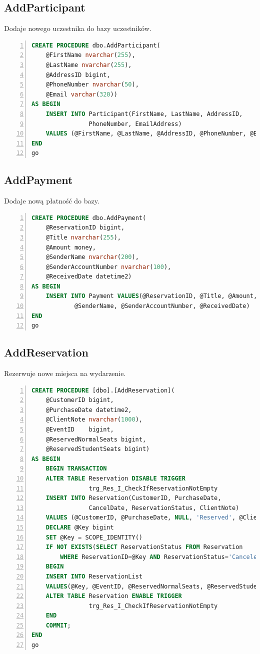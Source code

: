 \documentclass[]{article}
\begin{document}
	\subsection{AddParticipant}
	Dodaje nowego uczestnika do bazy uczestników.
	\begin{lstlisting}[language=SQL,
						showspaces=false,
						basicstyle=\ttfamily,
						numbers=left,
						numberstyle=\tiny,
						backgroundcolor=\color{lightg},
						keywordstyle=\color{lightblue},
						commentstyle=\color{gray}]
CREATE PROCEDURE dbo.AddParticipant(
	@FirstName nvarchar(255),
	@LastName nvarchar(255),
	@AddressID bigint,
	@PhoneNumber nvarchar(50),
	@Email varchar(320))
AS BEGIN
	INSERT INTO Participant(FirstName, LastName, AddressID,
				PhoneNumber, EmailAddress)
	VALUES (@FirstName, @LastName, @AddressID, @PhoneNumber, @Email);
END
go
	\end{lstlisting}
	
	\subsection{AddPayment}
	Dodaje nową płatność do bazy.
	\begin{lstlisting}[language=SQL,
						showspaces=false,
						basicstyle=\ttfamily,
						numbers=left,
						numberstyle=\tiny,
						backgroundcolor=\color{lightg},
						keywordstyle=\color{lightblue},
						commentstyle=\color{gray}]
CREATE PROCEDURE dbo.AddPayment(
	@ReservationID bigint,
	@Title nvarchar(255),
	@Amount money,
	@SenderName nvarchar(200),
	@SenderAccountNumber nvarchar(100),
	@ReceivedDate datetime2)
AS BEGIN
	INSERT INTO Payment VALUES(@ReservationID, @Title, @Amount,
			@SenderName, @SenderAccountNumber, @ReceivedDate)
END
go
	\end{lstlisting}

	\subsection{AddReservation}
	Rezerwuje nowe miejsca na wydarzenie.
	\begin{lstlisting}[language=SQL,
						showspaces=false,
						basicstyle=\ttfamily,
						numbers=left,
						numberstyle=\tiny,
						backgroundcolor=\color{lightg},
						keywordstyle=\color{lightblue},
						commentstyle=\color{gray}]
CREATE PROCEDURE [dbo].[AddReservation](
	@CustomerID bigint,
	@PurchaseDate datetime2,
	@ClientNote nvarchar(1000),
	@EventID	bigint,
	@ReservedNormalSeats bigint,
	@ReservedStudentSeats bigint)
AS BEGIN
	BEGIN TRANSACTION
	ALTER TABLE Reservation DISABLE TRIGGER
				trg_Res_I_CheckIfReservationNotEmpty
	INSERT INTO Reservation(CustomerID, PurchaseDate,
				CancelDate, ReservationStatus, ClientNote)
	VALUES (@CustomerID, @PurchaseDate, NULL, 'Reserved', @ClientNote)
	DECLARE @Key bigint
	SET @Key = SCOPE_IDENTITY()
	IF NOT EXISTS(SELECT ReservationStatus FROM Reservation
		WHERE ReservationID=@Key AND ReservationStatus='Canceled')
	BEGIN
	INSERT INTO ReservationList
	VALUES(@Key, @EventID, @ReservedNormalSeats, @ReservedStudentSeats) 
	ALTER TABLE Reservation ENABLE TRIGGER
				trg_Res_I_CheckIfReservationNotEmpty
	END
	COMMIT;
END
go
	\end{lstlisting}
\end{document}
